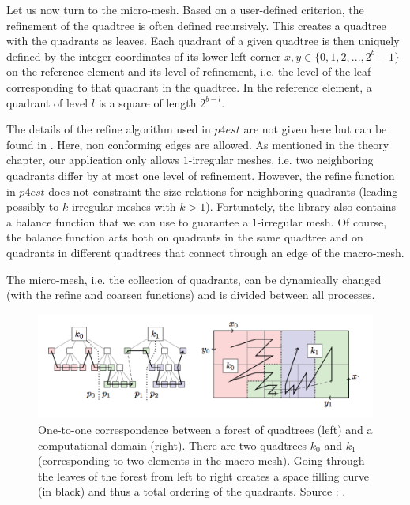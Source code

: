 Let us now turn to the micro-mesh. Based on a user-defined criterion, the refinement of the quadtree is often defined recursively. This creates a quadtree with the quadrants as leaves. Each quadrant of a given quadtree is then uniquely defined by the integer coordinates of its lower left corner $x,y \in \{0,1,2,...,2^b-1\}$ on the reference element and its level of refinement, i.e. the level of the leaf corresponding to that quadrant in the quadtree. In the reference element, a quadrant of level $l$ is a square of length $2^{b-l}$.


The details of the refine algorithm used in $p4est$ are not given here but can be found in \cite{p4est}. Here, non conforming edges are allowed. As mentioned in the theory chapter, our application only allows $1$-irregular meshes, i.e. two neighboring quadrants differ by at most one level of refinement. However, the refine function in $p4est$ does not constraint the size relations for neighboring quadrants (leading possibly to $k$-irregular meshes with $k>1$). Fortunately, the library also contains a balance function that we can use to guarantee a $1$-irregular mesh. Of course, the balance function acts both on quadrants in the same quadtree and on quadrants in different quadtrees that connect through an edge of the macro-mesh. 

The micro-mesh, i.e. the collection of quadrants, can be dynamically changed (with the refine and coarsen functions) and is divided between all processes. 

\begin{figure}
\centering
\includegraphics[scale=1.0]{Implementation/filling_curve.png}
\caption{One-to-one correspondence between a forest of quadtrees (left) and a computational domain (right). There are two quadtrees $k_0$ and $k_1$ (corresponding to two elements in the macro-mesh). Going through the leaves of the forest from left to right creates a space filling curve (in black) and thus a total ordering of the quadrants. Source : \cite{p4est}. }
\label{filling_curve}
\end{figure}

